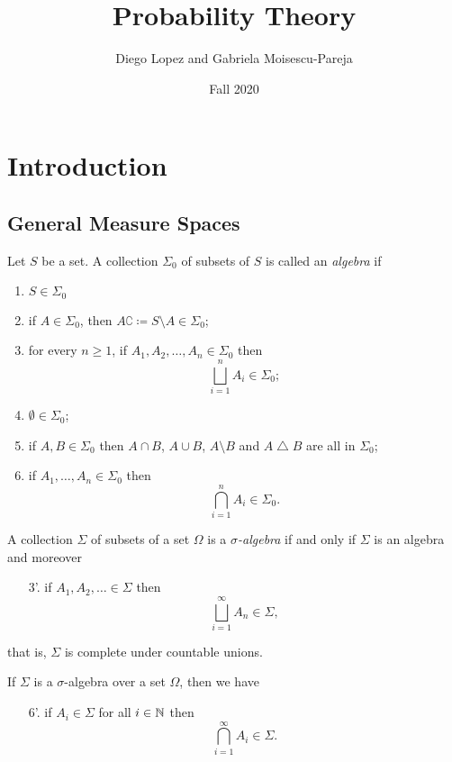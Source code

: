 \documentclass[12pt]{book}
\title{Probability Theory}
\author{Diego Lopez and Gabriela Moisescu-Pareja}
\date{Fall 2020}
\begin{document}
\maketitle

\chapter{Introduction}

\section{General Measure Spaces}
\begin{definition}
Let \( S \) be a set.
A collection \( \Sigma_0 \) of subsets of \( S \) is called an \emph{algebra} if
\begin{enumerate}
\item \( S \in \Sigma_0 \)
\item if \( A \in \Sigma_0 \), then \( A\complement \coloneqq S \setminus A \in \Sigma_0 \);
\item for every \( n \geq 1 \), if \( A_1, A_2, \ldots, A_n \in \Sigma_0 \) then \[ \bigsqcup_{i=1}^n A_i \in \Sigma_0; \]
\item \( \emptyset \in \Sigma_0 \);
\item if \( A, B \in \Sigma_0 \) then \( A \cap B \), \( A \cup B \), \( A \setminus B \) and \( A \mathbin{\triangle} B \) are all in \( \Sigma_0 \);
\item if \( A_1, \ldots, A_n \in \Sigma_0 \) then \[ \bigcap_{i=1}^n A_i \in \Sigma_0. \]
\end{enumerate}
\end{definition}

\begin{definition}
A collection \( \Sigma \) of subsets of a set \( \Omega \) is a \emph{\( \sigma \)-algebra} if and only if \( \Sigma \) is an algebra and moreover
\begin{enumerate}
\item[3'.] if \( A_1, A_2, \ldots \in \Sigma \) then \[ \bigsqcup_{i=1}^\infty A_n \in \Sigma, \]
\end{enumerate}
that is, \( \Sigma \) is complete under countable unions.
\end{definition}

\begin{proposition}
If \( \Sigma \) is a \( \sigma \)-algebra over a set \( \Omega \), then we have
\begin{enumerate}
\item[6'.] if \( A_i \in \Sigma \) for all \( i \in \mathbb{N} \) then \[ \bigcap_{i=1}^\infty A_i \in \Sigma. \]
\end{enumerate}
\end{proposition}
\end{document}
